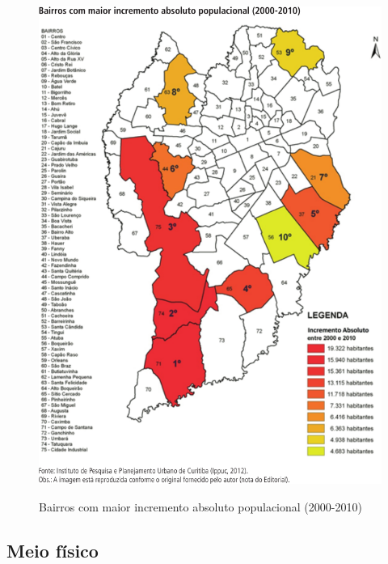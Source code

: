 	\begin{figure}
		\centering
		\caption{Bairros com maior incremento absoluto populacional (2000-2010)}
		\includegraphics[width=1.0\linewidth]{img/costa2015a_04}
		\label{fig:costa2015a_04}
	\end{figure}
    
	\subsection{Meio físico}
		

